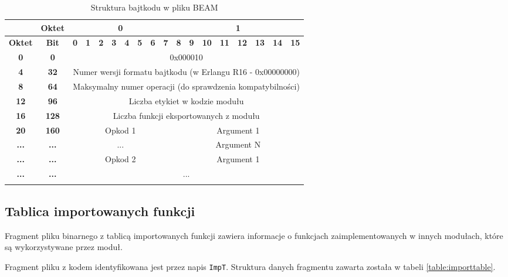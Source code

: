 \begin{longtable}{|c|c|c|c|c|c|c|c|c|c|c|c|c|c|c|c|c|c|}
\hline
         & \textbf{Oktet} & \multicolumn{8}{|c|}{\textbf{0}} & \multicolumn{8}{|c|}{\textbf{1}} \\
\hline
\textbf{Oktet} & \textbf{Bit} & \textbf{0} & \textbf{1} & \textbf{2} & \textbf{3} & \textbf{4} & \textbf{5} & \textbf{6} & \textbf{7} & \textbf{8} & \textbf{9} & \textbf{10} & \textbf{11} & \textbf{12} & \textbf{13} & \textbf{14} & \textbf{15}\\
\hline
\textbf{0} & \textbf{0} & \multicolumn{16}{|c|}{0x000010} \\[2ex]
\hline
\textbf{4} & \textbf{32} & \multicolumn{16}{|c|}{Numer wersji formatu bajtkodu (w Erlangu R16 - 0x00000000)}\\[2ex]
\hline
\textbf{8} & \textbf{64} & \multicolumn{16}{|c|}{Maksymalny numer operacji (do sprawdzenia kompatybilności)} \\[2ex]
\hline
\textbf{12} & \textbf{96} & \multicolumn{16}{|c|}{Liczba etykiet w kodzie modułu}\\[2ex]
\hline
\textbf{16} & \textbf{128} & \multicolumn{16}{|c|}{Liczba funkcji eksportowanych z modułu} \\[2ex]
\hline
\textbf{20} & \textbf{160} & \multicolumn{8}{|c|}{Opkod 1} & \multicolumn{8}{|c|}{Argument 1}  \\[10ex]
\hline
\textbf{...} & \textbf{...} & \multicolumn{8}{|c|}{...} & \multicolumn{8}{|c|}{Argument N}  \\[10ex]
\hline
\textbf{...} & \textbf{...} & \multicolumn{8}{|c|}{Opkod 2} & \multicolumn{8}{|c|}{Argument 1}  \\[10ex]
\hline
\textbf{...} & \textbf{...} & \multicolumn{16}{|c|}{...}  \\[10ex]
\hline
\caption{Struktura bajtkodu w pliku BEAM}
\label{table:bytecode} \\
\end{longtable}


\subsection{Tablica importowanych funkcji}
Fragment pliku binarnego z tablicą importowanych funkcji zawiera informacje o funkcjach zaimplementowanych w innych modułach, które są wykorzystywane przez moduł.

Fragment pliku z kodem identyfikowana jest przez napis \texttt{ImpT}. Struktura danych fragmentu zawarta została w tabeli \ref{table:importtable}.

